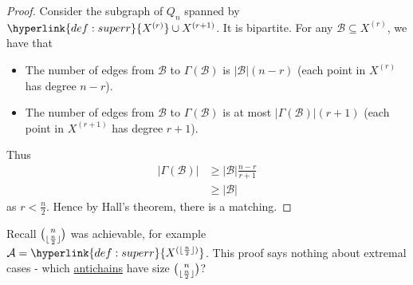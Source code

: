 \documentclass{article}
\DeclarePairedDelimiter\floor{\lfloor}{\rfloor}
\begin{document}
\begin{proof}
  Consider the subgraph of \hyperlink{def:qn}{$Q_n$} spanned by $\hyperlink{def:superr}{X^{(r)}} \cup X^{(r+1)}$. It is bipartite.
  For any $\mathcal{B} \subseteq X^{(r)}$, we have that
  \begin{itemize}
    \item The number of edges from $\mathcal{B}$ to $\Gamma(\mathcal{B})$ is $|\mathcal{B}| (n-r)$ (each point in $X^{(r)}$ has degree $n-r$).
    \item The number of edges from $\mathcal{B}$ to $\Gamma(\mathcal{B})$ is at most $|\Gamma(\mathcal{B})| (r+1)$ (each point in $X^{(r+1)}$ has degree $r+1$).
  \end{itemize}
  \begin{center}
  \end{center}
  Thus
  \begin{align*}
    |\Gamma(\mathcal{B})| &\geq |\mathcal{B}| \frac{n-r}{r+1} \\
                               &\geq |\mathcal{B}|
  \end{align*}
  as $r < \frac{n}{2}$.
  Hence by Hall's theorem, there is a matching.
\end{proof}

\begin{remark}
  Recall $\binom{n}{\floor{\frac{n}{2}}}$ was achievable, for example $\mathcal{A} = \hyperlink{def:superr}{X^{(\floor{\frac{n}{2}})}}$.
  This proof says nothing about extremal cases - which \hyperlink{def:antichain}{antichains} have size $\binom{n}{\floor{\frac{n}{2}}}$?
\end{remark}
\end{document}
